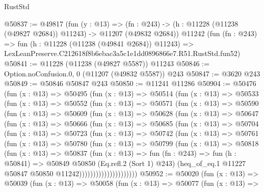 \begin{lexlean}{RustStd}
\begin{coremodule}
@50837 := @49817
    (fun (y : @13) =>
    (fn : @243) -> (h : @11228 (@11238 (@49827 @2684)) @11243) -> @11207 (@49832 @2684))
    @11242
    (fun (fn : @243) =>
    fun (h : @11228 (@11238 (@49841 @2684)) @11243) =>
    LexLeanPreserve.C212618f8b6ebac3a5c1e1dd0896866e7.R51.RustStd.fun52)
@50841 := @11228 (@11238 (@49827 @5587)) @11243
@50846 := Option.noConfusion.{0, 0} (@11207 (@49832 @5587)) @243
@50847 := @3620 @243
@50849 := @50846 @50847 @243
@50850 := @11241 @11286
@50904 := @50476
    (fun (x : @13) =>
    @50495
      (fun (x : @13) =>
      @50514
        (fun (x : @13) =>
        @50533
          (fun (x : @13) =>
          @50552
            (fun (x : @13) =>
            @50571
              (fun (x : @13) =>
              @50590
                (fun (x : @13) =>
                @50609
                  (fun (x : @13) =>
                  @50628
                    (fun (x : @13) =>
                    @50647
                      (fun (x : @13) =>
                      @50666
                        (fun (x : @13) =>
                        @50685
                          (fun (x : @13) =>
                          @50704
                            (fun (x : @13) =>
                            @50723
                              (fun (x : @13) =>
                              @50742
                                (fun (x : @13) =>
                                @50761
                                  (fun (x : @13) =>
                                  @50780
                                    (fun (x : @13) =>
                                    @50799
                                      (fun (x : @13) =>
                                      @50818
                                        (fun (x : @13) =>
                                        @50837
                                          (fun (x : @13) =>
                                          fun (fn : @243) =>
                                          fun (h : @50841) =>
                                          @50849
                                            @50850
                                            (Eq.refl.{2} (Sort 1) @243)
                                            (heq_of_eq.{1}
                                              @11227
                                              @50847
                                              @50850
                                              @11242)))))))))))))))))))))
@50952 := @50020
    (fun (x : @13) =>
    @50039
      (fun (x : @13) =>
      @50058
        (fun (x : @13) =>
        @50077
          (fun (x : @13) =>

\end{coremodule}
\end{lexlean}
